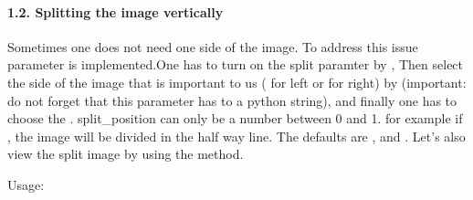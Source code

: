 \documentclass[letterpaper,10pt,english]{sphinxmanual}
\begin{document}
\begin{sphinxVerbatim}[commandchars=\\\{\}]
  
\end{sphinxVerbatim}



\paragraph{1.2. Splitting the image vertically}
\label{\detokenize{tutorials:splitting-the-image-vertically}}
\sphinxAtStartPar
Sometimes one does not need one side of the image. To address this issue 
parameter is implemented.One has to turn on the split paramter by ,
Then select the side of the image that is important to us ( for left or  for right)
by  (important: do not forget that this parameter has to a python string), and
finally one has to choose the . split\_position can only be a number between 0
and 1. for example if , the image will be divided in the half way line. The defaults are
,  and .
Let’s also view the split image by using the  method.

\sphinxAtStartPar
Usage:

\begin{sphinxVerbatim}[commandchars=\\\{\}]
  
\end{sphinxVerbatim}
\end{document}
